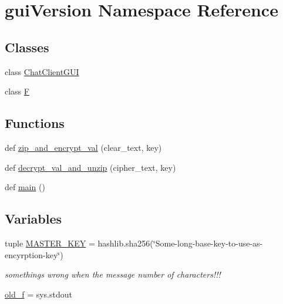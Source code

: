 \hypertarget{namespacegui_version}{}\section{gui\+Version Namespace Reference}
\label{namespacegui_version}
\subsection*{Classes}
\begin{DoxyCompactItemize}
\item 
class \hyperlink{classgui_version_1_1_chat_client_g_u_i}{Chat\+Client\+G\+U\+I}
\item 
class \hyperlink{classgui_version_1_1_f}{F}
\end{DoxyCompactItemize}
\subsection*{Functions}
\begin{DoxyCompactItemize}
\item 
def \hyperlink{namespacegui_version_ae8a9c77879e18f58a45597b28e21042b}{zip\+\_\+and\+\_\+encrypt\+\_\+val} (clear\+\_\+text, key)
\item 
def \hyperlink{namespacegui_version_a2925a99a40df97be6ae16f1a22184b24}{decrypt\+\_\+val\+\_\+and\+\_\+unzip} (cipher\+\_\+text, key)
\item 
def \hyperlink{namespacegui_version_a79d3b927a5ac9c40a255afc12ebfa5bb}{main} ()
\end{DoxyCompactItemize}
\subsection*{Variables}
\begin{DoxyCompactItemize}
\item 
tuple \hyperlink{namespacegui_version_ad80b491a9fbc91c221e73a124bff5d05}{M\+A\+S\+T\+E\+R\+\_\+\+K\+E\+Y} = hashlib.\+sha256(\char`\"{}Some-\/long-\/base-\/key-\/to-\/use-\/as-\/encyrption-\/key\char`\"{})
\begin{DoxyCompactList}\small\item\em somethings wrong when the message number of characters!!! \end{DoxyCompactList}\item 
\hyperlink{namespacegui_version_a77c635f5f5d51002c89931af7228063c}{old\+\_\+f} = sys.\+stdout
\end{DoxyCompactItemize}


